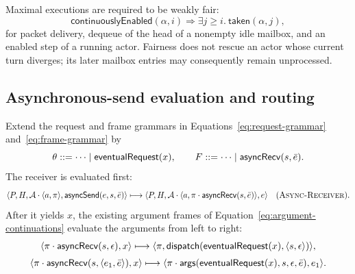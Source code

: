 Maximal executions are required to be weakly fair:
\begin{equation}\label{eq:actor-fairness}
 \mathsf{continuouslyEnabled}(\alpha,i)
   \Longrightarrow\exists j\ge i.\ \mathsf{taken}(\alpha,j),
\end{equation}
for packet delivery, dequeue of the head of a nonempty idle mailbox, and an
enabled step of a running actor.  Fairness does not rescue an actor whose
current turn diverges; its later mailbox entries may consequently remain
unprocessed.

\subsection{Asynchronous-send evaluation and routing}

Extend the request and frame grammars in
Equations~\eqref{eq:request-grammar} and~\eqref{eq:frame-grammar} by
\begin{equation}\label{eq:async-frames}
 \theta::=\cdots\mid\mathsf{eventualRequest}(x),\qquad
 F::=\cdots\mid\mathsf{asyncRecv}(s,\bar e).
\end{equation}
The receiver is evaluated first:
\[
 \langle P,H,\mathcal A\cdot\langle a,\pi\rangle,
        \mathsf{asyncSend}(e,s,\bar e)\rangle
 \longmapsto
 \langle P,H,\mathcal A\cdot
        \langle a,\pi\cdot\mathsf{asyncRecv}(s,\bar e)\rangle,e\rangle
 \quad(\textsc{Async-Receiver}).
\]
After it yields $x$, the existing argument frames of
Equation~\eqref{eq:argument-continuations} evaluate the arguments from left to
right:
\begin{equation}\label{eq:async-receiver-continuations}
\begin{array}{c}
 \langle\pi\cdot\mathsf{asyncRecv}(s,\epsilon),x\rangle
  \longmapsto
 \langle\pi,\mathsf{dispatch}(\mathsf{eventualRequest}(x),
                          \langle s,\epsilon\rangle)\rangle,\\[2mm]
 \langle\pi\cdot\mathsf{asyncRecv}(s,\langle e_1,\bar e\rangle),x\rangle
  \longmapsto
 \langle\pi\cdot\mathsf{args}(\mathsf{eventualRequest}(x),s,\epsilon,\bar e),e_1\rangle.
\end{array}
\end{equation}

